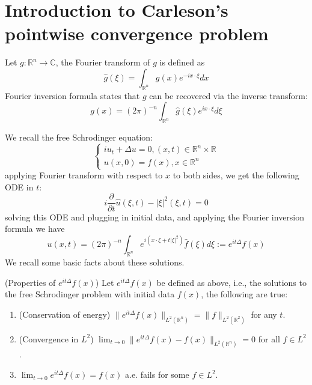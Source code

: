 \documentclass[openany]{book}
\newcommand{\R}{\mathbb{R}}
\newcommand{\C}{\mathbb{C}}
\begin{document}
\section{Introduction to Carleson's pointwise convergence problem}
\begin{defn}
Let $g:\R^n\to\C$, the Fourier transform of $g$ is defined as 
\begin{equation*}
    \hat{g}(\xi)=\int_{\R^n}g(x)e^{-ix\cdot\xi}dx
\end{equation*}
Fourier inversion formula states that $g$ can be recovered via the inverse transform:
\begin{equation*}
    g(x)=(2\pi)^{-n}\int_{\R^n}\hat{g}(\xi)e^{ix\cdot\xi}d\xi
\end{equation*}
\end{defn}
We recall the free Schrodinger equation:
\begin{equation*}
    \begin{cases}
        iu_t+\Delta u=0, (x,t)\in\R^n\times\R\\
        u(x,0)=f(x), x\in\R^n
    \end{cases}
\end{equation*}
applying Fourier transform with respect to $x$ to both sides, we get the following ODE in $t$:
\begin{equation*}
    i\frac{\partial}{\partial t}\hat{u}(\xi, t)-|\xi|^2(\xi,t)=0
\end{equation*}
solving this ODE and plugging in initial data, and applying the Fourier inversion formula we have 
\begin{equation*}
    u(x,t)=(2\pi)^{-n}\int_{\R^n}e^{i(x\cdot\xi+t|\xi|^2)}\hat{f}(\xi)d\xi:=e^{it\Delta}f(x)
\end{equation*}
We recall some basic facts about these solutions.
\begin{prop}(Properties of $e^{it\Delta}f(x)$)
    Let $e^{it\Delta}f(x)$ be defined as above, i.e., the solutions to the free Schrodinger problem with initial data $f(x)$, the following are true:
    \begin{enumerate}
        \item (Conservation of energy) $\|e^{it\Delta}f(x)\|_{L^2(\R^n)}=\|f\|_{L^2(\R^2)}$ for any $t$.
        \item (Convergence in $L^2$) $\lim_{t\to 0}\|e^{it\Delta}f(x)-f(x)\|_{L^2(\R^n)}=0$ for all $f\in L^2$.
        \item $\lim_{t\to 0}e^{it\Delta}f(x)=f(x)$ a.e. fails for some $f\in L^2$. 
    \end{enumerate}
\end{prop}
\end{document}
